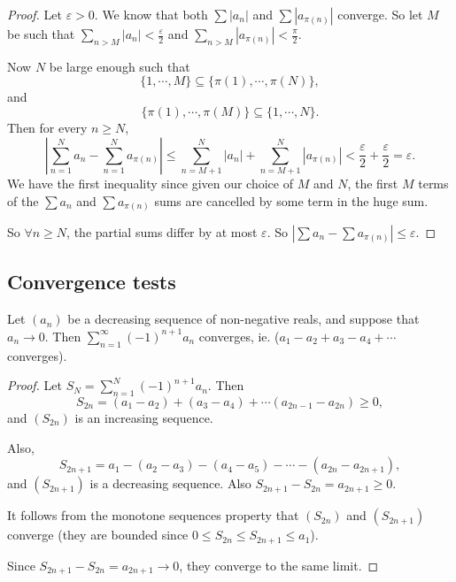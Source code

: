 \documentclass[a4paper]{article}
\begin{document}
\begin{proof}
  Let $\varepsilon > 0$. We know that both $\sum |a_n|$ and $\sum|a_{\pi(n)}|$ converge. So let $M$ be such that $\sum_{n > M}|a_n| < \frac{\varepsilon}{2}$ and $\sum_{n > M}|a_{\pi(n)}| < \frac{\pi}{2}$.

  Now $N$ be large enough such that
  \[
    \{1, \cdots, M\}\subseteq \{\pi(1), \cdots, \pi(N)\},
  \]
  and
  \[
    \{\pi(1), \cdots, \pi(M)\}\subseteq \{1, \cdots, N\}.
  \]
  Then for every $n\geq N$,
  \[
    \left|\sum_{n = 1}^N a_n - \sum_{n = 1}^N a_{\pi(n)}\right| \leq \sum_{n = M + 1}^N |a_n| + \sum_{n = M + 1}^N |a_{\pi(n)}| < \frac{\varepsilon}{2} + \frac{\varepsilon}{2} = \varepsilon.
  \]
  We have the first inequality since given our choice of $M$ and $N$, the first $M$ terms of the $\sum a_n$ and $\sum  a_{\pi(n)}$ sums are cancelled by some term in the huge sum.

  So $\forall n \geq N$, the partial sums differ by at most $\varepsilon$. So $|\sum a_n - \sum a_{\pi(n)}| \leq \varepsilon$.
\end{proof}

\subsection{Convergence tests}
\begin{lemma}
  Let $(a_n)$ be a decreasing sequence of non-negative reals, and suppose that $a_n \to 0$. Then $\displaystyle \sum_{n = 1}^\infty (-1)^{n + 1}a_n$ converges, ie. ($a_1 - a_2 + a_3 - a_4 + \cdots$ converges).
\end{lemma}

\begin{proof}
  Let $\displaystyle S_N = \sum_{n = 1}^N(-1)^{n + 1}a_n$. Then
  \[
    S_{2n} = (a_1 - a_2) + (a_3 - a_4) + \cdots (a_{2n - 1} - a_{2n}) \geq 0,
  \]
  and $(S_{2n})$ is an increasing sequence.

  Also,
  \[
    S_{2n + 1} = a_1 - (a_2 - a_3) - (a_4 - a_5) - \cdots - (a_{2n} - a_{2n + 1}),
  \]
  and $(S_{2n + 1})$ is a decreasing sequence. Also $S_{2n + 1} - S_{2n} = a_{2n + 1} \geq 0$.

  It follows from the monotone sequences property that $(S_{2n})$ and $(S_{2n + 1})$ converge (they are bounded since $0 \leq S_{2n} \leq S_{2n + 1} \leq a_1$).

  Since $S_{2n + 1} - S_{2n} = a_{2n + 1} \to 0$, they converge to the same limit.
\end{proof}
\end{document}
